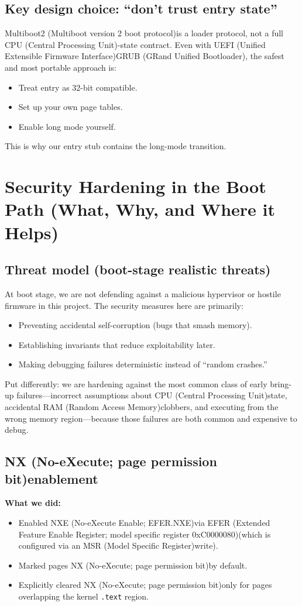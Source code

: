 \documentclass[11pt]{article}
\newcommand{\CPU}{CPU (Central Processing Unit)}
\newcommand{\EFER}{EFER (Extended Feature Enable Register; model specific register 0xC0000080)}
\newcommand{\GRUB}{GRUB (GRand Unified Bootloader)}
\newcommand{\MBtwo}{Multiboot2 (Multiboot version 2 boot protocol)}
\newcommand{\MSR}{MSR (Model Specific Register)}
\newcommand{\NX}{NX (No-eXecute; page permission bit)}
\newcommand{\NXE}{NXE (No-eXecute Enable; EFER.NXE)}
\newcommand{\RAM}{RAM (Random Access Memory)}
\newcommand{\UEFI}{UEFI (Unified Extensible Firmware Interface)}
\begin{document}
\subsection{Key design choice: ``don’t trust entry state''}
\MBtwo is a loader protocol, not a full \CPU-state contract. Even with \UEFI \GRUB, the safest and most portable approach is:
\begin{itemize}
  \item Treat entry as 32-bit compatible.
  \item Set up your own page tables.
  \item Enable long mode yourself.
\end{itemize}

This is why our entry stub contains the long-mode transition.

\newpage
\section{Security Hardening in the Boot Path (What, Why, and Where it Helps)}

\subsection{Threat model (boot-stage realistic threats)}
At boot stage, we are not defending against a malicious hypervisor or hostile firmware in this project. The security measures here are primarily:
\begin{itemize}
  \item Preventing accidental self-corruption (bugs that smash memory).
  \item Establishing invariants that reduce exploitability later.
  \item Making debugging failures deterministic instead of ``random crashes.''
\end{itemize}

Put differently: we are hardening against the most common class of early bring-up failures---incorrect assumptions about \CPU state, accidental \RAM clobbers, and executing from the wrong memory region---because those failures are both common and expensive to debug.

\subsection{\NX enablement}
\textbf{What we did:}
\begin{itemize}
  \item Enabled \NXE via \EFER (which is configured via an \MSR write).
  \item Marked pages \NX by default.
  \item Explicitly cleared \NX only for pages overlapping the kernel \texttt{.text} region.
\end{itemize}
\end{document}
